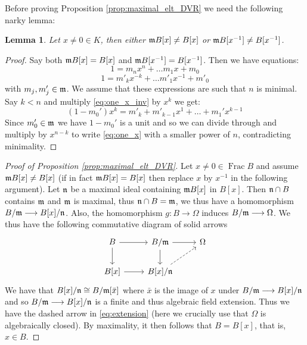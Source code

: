 \documentclass[12pt]{article}
\theoremstyle{plain}
\newtheorem{lemma}[thm]{Lemma}
\theoremstyle{definition}
\newcommand{\lto}{\longrightarrow}
\begin{document}
Before proving Proposition \ref{prop:maximal_elt_DVR} we need the following narky lemma:
\begin{lemma}
\label{lem:narky} Let $x \neq 0 \in K$, then either $\frak{m}B[x] \neq B[x]$ or $\frak{m}B[x^{-1}] \neq B[x^{-1}]$.
\end{lemma}
\begin{proof}
Say both $\frak{m}B[x] = B[x]$ and $\frak{m}B[x^{-1}] = B[x^{-1}]$. Then we have equations:
\begin{equation}
\label{eq:one_x}
    1 = m_nx^{n} + \hdots m_1x + m_0
\end{equation}
\begin{equation}
\label{eq:one_x_inv}
    1 = m'_kx^{-k} + \hdots m'_1x^{-1} + m'_0
\end{equation}
with $m_j,m_j' \in \frak{m}$. We assume that these expressions are such that $n$ is minimal. Say $k < n$ and multiply \eqref{eq:one_x_inv} by $x^k$ we get:
\begin{equation}
    \label{eq:one_x_inv_modified}
    (1 - m_0')x^k = m'_k + m'_{k-1}x^{1} + \hdots + m_1'x^{k-1}
\end{equation}
Since $m_0' \in \frak{m}$ we have $1 - m_0'$ is a unit and so we can divide through and multiply by $x^{n - k}$ to write \eqref{eq:one_x} with a smaller power of $n$, contradicting minimality.
\end{proof}
\begin{proof}[Proof of Proposition \ref{prop:maximal_elt_DVR}]
Let $x \neq 0 \in \operatorname{Frac}B$ and assume $\frak{m}B[x] \neq B[x]$ (if in fact $\frak{m}B[x] = B[x]$ then replace $x$ by $x^{-1}$ in the following argument). Let $\frak{n}$ be a maximal ideal containing $\frak{m}B[x]$ in $B[x]$. Then $\frak{n} \cap B$ contains $\frak{m}$ and $\frak{m}$ is maximal, thus $\frak{n} \cap B = \frak{m}$, we thus have a homomorphism $B/\frak{m} \lto B[x]/\frak{n}$. Also, the homomorphism $g: B \lto \Omega$ induces $B/\frak{m} \lto \Omega$. We thus have the following commutative diagram of solid arrows
\begin{equation}
\label{eq:extension}
\begin{tikzcd}
B\arrow[r]\arrow[d] & B/\frak{m}\arrow[r]\arrow[d] & \Omega\\
B[x]\arrow[r] & B[x]/\frak{n}\arrow[ur,dashed]
\end{tikzcd}
\end{equation}
We have that $B[x]/\frak{n} \cong B/\frak{m}[\bar{x}]$ where $\bar{x}$ is the image of $x$ under $B/\frak{m} \lto B[x]/\frak{n}$ and so $B/\frak{m} \lto B[x]/\frak{n}$ is a finite and thus algebraic field extension. Thus we have the dashed arrow in \eqref{eq:extension} (here we crucially use that $\Omega$ is algebraically closed). By maximality, it then follows that $B = B[x]$, that is, $x \in B$.
\end{proof}
\end{document}
